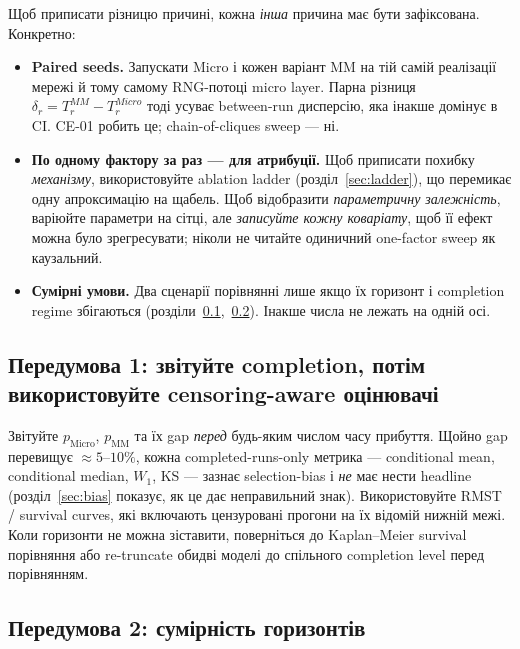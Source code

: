 \documentclass[11pt,a4paper]{article}
\begin{document}
Щоб приписати різницю причині, кожна \emph{інша} причина має бути зафіксована.
Конкретно:
\begin{itemize}
  \item \textbf{Paired seeds.}  Запускати Micro і кожен варіант MM на тій самій
        реалізації мережі й тому самому RNG-потоці micro layer.  Парна
        різниця $\delta_r = T_r^{MM}-T_r^{Micro}$ тоді усуває between-run
        дисперсію, яка інакше домінує в CI.  CE-01 робить це;
        chain-of-cliques sweep --- ні.
  \item \textbf{По одному фактору за раз --- для атрибуції.}  Щоб приписати
        похибку \emph{механізму}, використовуйте ablation ladder (розділ~\ref{sec:ladder}),
        що перемикає одну апроксимацію на щабель.  Щоб відобразити \emph{параметричну
        залежність}, варіюйте параметри на сітці, але \emph{записуйте кожну коваріату},
        щоб її ефект можна було зрегресувати; ніколи не читайте одиничний
        one-factor sweep як каузальний.
  \item \textbf{Сумірні умови.}  Два сценарії порівнянні лише якщо
        їх горизонт і completion regime збігаються
        (розділи~\ref{sec:cens},~\ref{sec:horizon}).  Інакше числа не
        лежать на одній осі.
\end{itemize}

\subsection{Передумова 1: звітуйте completion, потім використовуйте censoring-aware оцінювачі}
\label{sec:cens}

Звітуйте $p_{\mathrm{Micro}}$, $p_{\mathrm{MM}}$ та їх gap \emph{перед} будь-яким
числом часу прибуття.  Щойно gap перевищує $\approx 5$--$10\%$, кожна
completed-runs-only метрика --- conditional mean, conditional median, $W_1$,
KS --- зазнає selection-bias і \emph{не} має нести headline
(розділ~\ref{sec:bias} показує, як це дає неправильний знак).  Використовуйте RMST /
survival curves, які включають цензуровані прогони на їх відомій нижній межі.  Коли
горизонти не можна зіставити, поверніться до Kaplan--Meier survival порівняння або
re-truncate обидві моделі до спільного completion level перед порівнянням.

\subsection{Передумова 2: сумірність горизонтів}
\label{sec:horizon}
\end{document}
